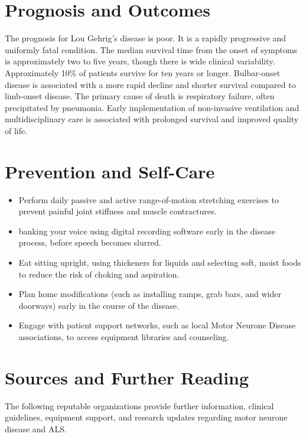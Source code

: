 \section*{Prognosis and Outcomes}
The prognosis for Lou Gehrig's disease is poor. It is a rapidly progressive and uniformly fatal condition. The median survival time from the onset of symptoms is approximately two to five years, though there is wide clinical variability. Approximately 10\% of patients survive for ten years or longer. Bulbar-onset disease is associated with a more rapid decline and shorter survival compared to limb-onset disease. The primary cause of death is respiratory failure, often precipitated by pneumonia. Early implementation of non-invasive ventilation and multidisciplinary care is associated with prolonged survival and improved quality of life.

\section*{Prevention and Self-Care}
\begin{itemize}
    \item Perform daily passive and active range-of-motion stretching exercises to prevent painful joint stiffness and muscle contractures.
    \item banking your voice using digital recording software early in the disease process, before speech becomes slurred.
    \item Eat sitting upright, using thickeners for liquids and selecting soft, moist foods to reduce the risk of choking and aspiration.
    \item Plan home modifications (such as installing ramps, grab bars, and wider doorways) early in the course of the disease.
    \item Engage with patient support networks, such as local Motor Neurone Disease associations, to access equipment libraries and counseling.
\end{itemize}

\section*{Sources and Further Reading}
The following reputable organizations provide further information, clinical guidelines, equipment support, and research updates regarding motor neurone disease and ALS.

